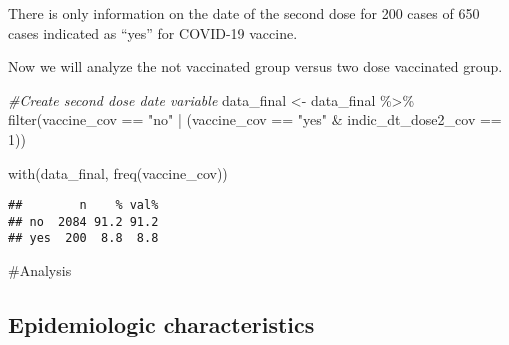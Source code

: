 \documentclass[
]{article}
\newenvironment{Shaded}{\begin{snugshade}}{\end{snugshade}}
\newcommand{\CommentTok}[1]{\textcolor[rgb]{0.56,0.35,0.01}{\textit{#1}}}
\newcommand{\DecValTok}[1]{\textcolor[rgb]{0.00,0.00,0.81}{#1}}
\newcommand{\FunctionTok}[1]{\textcolor[rgb]{0.00,0.00,0.00}{#1}}
\newcommand{\NormalTok}[1]{#1}
\newcommand{\OtherTok}[1]{\textcolor[rgb]{0.56,0.35,0.01}{#1}}
\newcommand{\SpecialCharTok}[1]{\textcolor[rgb]{0.00,0.00,0.00}{#1}}
\newcommand{\StringTok}[1]{\textcolor[rgb]{0.31,0.60,0.02}{#1}}
\begin{document}
There is only information on the date of the second dose for 200 cases
of 650 cases indicated as ``yes'' for COVID-19 vaccine.

Now we will analyze the not vaccinated group versus two dose vaccinated
group.

\begin{Shaded}
\begin{Highlighting}[]
\CommentTok{\#Create second dose date variable}
\NormalTok{data\_final }\OtherTok{\textless{}{-}}\NormalTok{ data\_final }\SpecialCharTok{\%\textgreater{}\%} 
  \FunctionTok{filter}\NormalTok{(vaccine\_cov }\SpecialCharTok{==} \StringTok{"no"} \SpecialCharTok{|}\NormalTok{ (vaccine\_cov }\SpecialCharTok{==} \StringTok{"yes"} \SpecialCharTok{\&}\NormalTok{ indic\_dt\_dose2\_cov }\SpecialCharTok{==} \DecValTok{1}\NormalTok{))}

\FunctionTok{with}\NormalTok{(data\_final, }\FunctionTok{freq}\NormalTok{(vaccine\_cov))}
\end{Highlighting}
\end{Shaded}

\begin{verbatim}
##        n    % val%
## no  2084 91.2 91.2
## yes  200  8.8  8.8
\end{verbatim}

\#Analysis

\hypertarget{epidemiologic-characteristics}{%
\subsection{Epidemiologic
characteristics}\label{epidemiologic-characteristics}}
\end{document}
